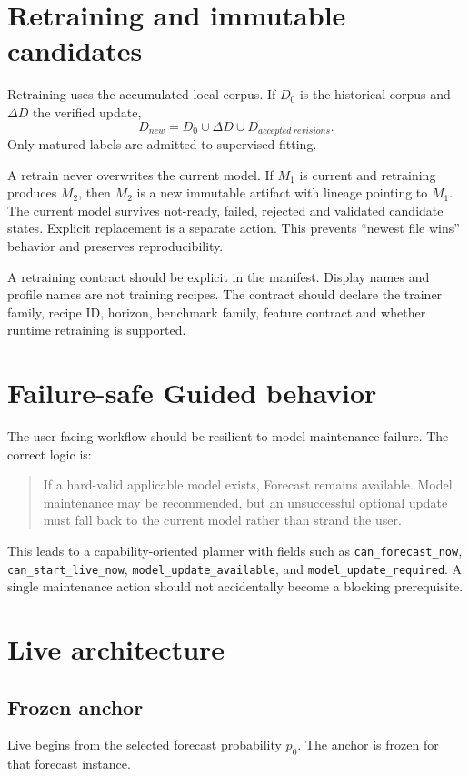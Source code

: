 \documentclass[11pt]{article}
\begin{document}
\section{Retraining and immutable candidates}
Retraining uses the accumulated local corpus. If $D_0$ is the historical corpus and $\Delta D$ the verified update,
\begin{equation}
D_{new}=D_0\cup \Delta D\cup D_{accepted\ revisions}.
\end{equation}
Only matured labels are admitted to supervised fitting.

A retrain never overwrites the current model. If $M_1$ is current and retraining produces $M_2$, then $M_2$ is a new immutable artifact with lineage pointing to $M_1$. The current model survives not-ready, failed, rejected and validated candidate states. Explicit replacement is a separate action. This prevents ``newest file wins'' behavior and preserves reproducibility.

A retraining contract should be explicit in the manifest. Display names and profile names are not training recipes. The contract should declare the trainer family, recipe ID, horizon, benchmark family, feature contract and whether runtime retraining is supported.

\section{Failure-safe Guided behavior}
The user-facing workflow should be resilient to model-maintenance failure. The correct logic is:
\begin{quote}
If a hard-valid applicable model exists, Forecast remains available. Model maintenance may be recommended, but an unsuccessful optional update must fall back to the current model rather than strand the user.
\end{quote}

This leads to a capability-oriented planner with fields such as \texttt{can\_forecast\_now}, \texttt{can\_start\_live\_now}, \texttt{model\_update\_available}, and \texttt{model\_update\_required}. A single maintenance action should not accidentally become a blocking prerequisite.

\section{Live architecture}
\subsection{Frozen anchor}
Live begins from the selected forecast probability $p_0$. The anchor is frozen for that forecast instance.
\end{document}
